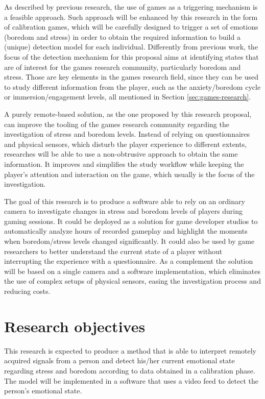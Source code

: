 As described by previous research, the use of games as a triggering mechanism is a feasible approach. Such approach will be enhanced by this research in the form of calibration games, which will be carefully designed to trigger a set of emotions (boredom and stress) in order to obtain the required information to build a (unique) detection model for each individual. Differently from previous work, the focus of the detection mechanism for this proposal aims at identifying states that are of interest for the games research community, particularly boredom and stress. Those are key elements in the games research field, since they can be used to study different information from the player, such as the anxiety/boredom cycle or immersion/engagement levels, all mentioned in Section \ref{sec:games-research}.

A purely remote-based solution, as the one proposed by this research proposal, can improve the tooling of the games research community regarding the investigation of stress and boredom levels. Instead of relying on questionnaires and physical sensors, which disturb the player experience to different extents, researches will be able to use a non-obtrusive approach to obtain the same information. It improves and simplifies the study workflow while keeping the player's attention and interaction on the game, which usually is the focus of the investigation.

The goal of this research is to produce a software able to rely on an ordinary camera to investigate changes in stress and boredom levels of players during gaming sessions. It could be deployed as a solution for game developer studios to automatically analyze hours of recorded gameplay and highlight the moments when boredom/stress levels changed significantly. It could also be used by game researchers to better understand the current state of a player without interrupting the experience with a questionnaire. As a complement the solution will be based on a single camera and a software implementation, which eliminates the use of complex setups of physical sensors, easing the investigation process and reducing costs.


\section{Research objectives}

This research is expected to produce a method that is able to interpret remotely acquired signals from a person and detect his/her current emotional state regarding stress and boredom according to data obtained in a calibration phase. The model will be implemented in a software that uses a video feed to detect the person's emotional state. %

